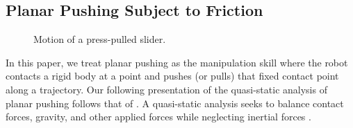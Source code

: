 \documentclass[conference]{IEEEtran}
\newcommand{\BB}[1]{{\color{red} {Byron: {#1}}}}
\begin{document}



\subsection{Planar Pushing Subject to Friction}\label{sec:plan-push-subj}

\begin{figure}[t]
  \centering
  \def\iangle{35} %
  \caption{Motion of a press-pulled slider.}
  \label{fig:presspull-motion}
\end{figure}

In this paper, we treat planar pushing as the manipulation skill where
the robot contacts a rigid body at a point and pushes (or pulls) that
fixed contact point along a trajectory.
Our following presentation of the quasi-static analysis of planar
pushing follows that of \cite{alexander1993bounds, Mason}. A
quasi-static analysis seeks to balance contact forces, gravity, and
other applied forces while neglecting inertial forces \cite{Mason}.
\end{document}

